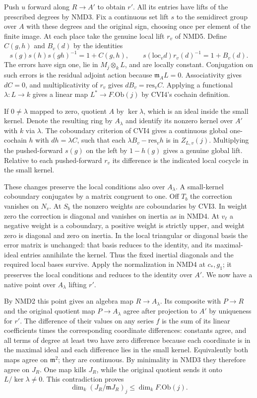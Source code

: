 Push $u$ forward along $R\to A'$ to obtain $r'$. All its entries
have lifts of the prescribed degrees by NMD3. Fix a continuous set
lift $s$ to the semidirect group over $A$ with these degrees and
the original sign, choosing once per element of the finite image.
At each place take the genuine local lift $r_v$ of NMD5. Define
$C(g,h)$ and $B_v(d)$ by the identities
\[
 s(g)s(h)s(gh)^{-1}=1+C(g,h),\qquad
 s(\mathrm{loc}_v d)r_v(d)^{-1}=1+B_v(d).
\]
The errors have sign one, lie in $M_j\otimes_k L$, and are locally
constant. Conjugation on such errors is the residual adjoint action
because $\mathfrak m_A L=0$. Associativity gives $dC=0$, and
multiplicativity of $r_v$ gives $dB_v=\mathrm{res}_v C$.
Applying a functional $\lambda:L\to k$ gives a linear map
$L^*\to F.\mathrm{Ob}(j)$ by CVI4's cochain definition.

If $0\ne\lambda$ mapped to zero, quotient $A$ by $\ker\lambda$,
which is an ideal inside the small kernel. Denote the resulting ring
by $A_\lambda$ and identify its nonzero kernel over $A'$ with $k$
via $\lambda$. The coboundary criterion of CVI4 gives a continuous
global one-cochain $h$ with $dh=\lambda C$, such that each
$\lambda B_v-\mathrm{res}_v h$ is in $Z_{L,v}(j)$. Multiplying
the pushed-forward $s(g)$ on the left by $1-h(g)$ gives a genuine
global lift. Relative to each pushed-forward $r_v$ its difference
is the indicated local cocycle in the small kernel.

These changes preserve the local conditions also over $A_\lambda$.
A small-kernel coboundary conjugates by a matrix congruent to one.
Off $T_b$ the correction vanishes on $N_v$. At $S_b$ the nonzero
weights are coboundaries by CVI3. In weight zero the correction is
diagonal and vanishes on inertia as in NMD4. At $v_\ell$ a negative
weight is a coboundary, a positive weight is strictly upper, and
weight zero is diagonal and zero on inertia. In the local triangular
or diagonal basis the error matrix is unchanged: that basis reduces
to the identity, and its maximal-ideal entries annihilate the
kernel. Thus the fixed inertial diagonals and the required local
bases survive. Apply the normalization in NMD4 at $c_*,g_1$;
it preserves the local conditions and reduces to the identity over
$A'$. We now have a native point over $A_\lambda$ lifting $r'$.

By NMD2 this point gives an algebra map $R\to A_\lambda$. Its
composite with $P\to R$ and the original quotient map
$P\to A_\lambda$ agree after projection to $A'$ by uniqueness
for $r'$. The difference of their values on any series $f$ is
the sum of its linear coefficients times the corresponding
coordinate differences: constants agree, and all terms of degree
at least two have zero difference because each coordinate is in
the maximal ideal and each difference lies in the small kernel.
Equivalently both maps agree on $\mathfrak m^2$; they are
continuous. By minimality in NMD3 they therefore agree on $J_R$.
One map kills $J_R$, while the original quotient sends it onto
$L/\ker\lambda\ne0$. This contradiction proves
\[
 \dim_k (J_R/\mathfrak mJ_R)_j\le\dim_k F.\mathrm{Ob}(j).
\]

